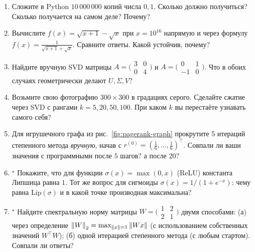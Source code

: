 \begin{tasksbox}
\begin{enumerate}\itemsep1pt
  \item Сложите в Python $10\,000\,000$ копий числа $0{,}1$. Сколько
        должно получиться? Сколько получается на самом деле? Почему?
  \item Вычислите $f(x)=\sqrt{x+1}-\sqrt{x}$ при $x=10^{16}$
        напрямую и через формулу $f(x)=\frac{1}{\sqrt{x+1}+\sqrt{x}}$.
        Сравните ответы. Какой устойчив, почему?
  \item Найдите вручную SVD матрицы
        $A=\bigl(\begin{smallmatrix}3 & 0\\0 & 4\end{smallmatrix}\bigr)$
        и $A=\bigl(\begin{smallmatrix}0 & 1\\-1 & 0\end{smallmatrix}\bigr)$.
        Что в обоих случаях геометрически делают $U, \Sigma, V$?
  \item Возьмите свою фотографию $300\times 300$ в градациях серого.
        Сделайте сжатие через SVD с рангами $k=5, 20, 50, 100$. При
        каком $k$ вы перестаёте узнавать самого себя?
  \item Для игрушечного графа из рис.~\ref{fig:pagerank-graph}
        прокрутите 5 итераций степенного метода \emph{вручную},
        начав с $r^{(0)}=(\tfrac16,\ldots,\tfrac16)^{\!\top}$. Совпали ли
        ваши значения с программными после $5$ шагов? а после $20$?
  \item $^{\star}$ Покажите, что для функции $\sigma(x)=\max(0,x)$
        (ReLU) константа Липшица равна $1$. Тот же вопрос для
        сигмоиды $\sigma(x)=1/(1+e^{-x})$: чему равна $\mathrm{Lip}(\sigma)$
        и в какой точке производная максимальна?
  \item $^{\star}$ Найдите спектральную норму матрицы
        $W=\bigl(\begin{smallmatrix}1 & 2\\2 & 1\end{smallmatrix}\bigr)$
        двумя способами: (а) через определение
        $\left\|W\right\|_2=\max_{\left\|x\right\|=1}\left\|Wx\right\|$ (с использованием
        собственных значений $W^{\!\top}W$); (б) одной итерацией
        степенного метода (с любым стартом). Совпали ли ответы?
\end{enumerate}
\end{tasksbox}
